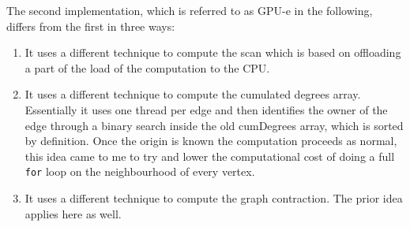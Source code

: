 \documentclass[a4paper,10pt]{article}
\begin{document}
The second implementation, which is referred to as GPU-e in the following, differs from the first in three ways:
\begin{enumerate}
	\item It uses a different technique to compute the scan which is based on offloading a part of the load of the computation to the CPU.
	\item It uses a different technique to compute the cumulated degrees array. Essentially it uses one thread per edge and then identifies the owner of the edge through a binary search inside the old cumDegrees array, which is sorted by definition. Once the origin is known the computation proceeds as normal, this idea came to me to try and lower the computational cost of doing a full \texttt{for} loop on the neighbourhood of every vertex.
	\item It uses a different technique to compute the graph contraction. The prior idea applies here as well.
\end{enumerate}
\end{document}
